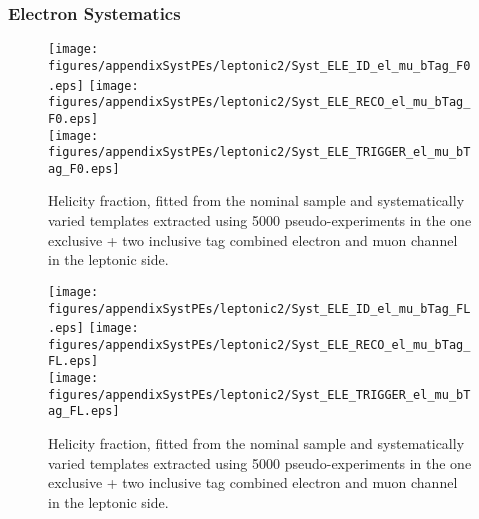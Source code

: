 \subsubsection{Electron Systematics}
\begin{figure}[!hb]
\begin{center}
        \texttt{[image: figures/appendixSystPEs/leptonic2/Syst\_ELE\_ID\_el\_mu\_bTag\_F0.eps]}
        \texttt{[image: figures/appendixSystPEs/leptonic2/Syst\_ELE\_RECO\_el\_mu\_bTag\_F0.eps]}\\
        \texttt{[image: figures/appendixSystPEs/leptonic2/Syst\_ELE\_TRIGGER\_el\_mu\_bTag\_F0.eps]}
\caption{Helicity fraction, \fo fitted from the nominal \ttbar sample and systematically varied templates extracted using 5000 pseudo-experiments in the one exclusive + two inclusive \bt tag combined electron and muon channel in the leptonic side. }
\label{fig:systematicVar_lep_f0_elmu2incl_ELE}
\end{center}
\end{figure}

\begin{figure}[!hb]
\begin{center}
        \texttt{[image: figures/appendixSystPEs/leptonic2/Syst\_ELE\_ID\_el\_mu\_bTag\_FL.eps]}
        \texttt{[image: figures/appendixSystPEs/leptonic2/Syst\_ELE\_RECO\_el\_mu\_bTag\_FL.eps]}\\
        \texttt{[image: figures/appendixSystPEs/leptonic2/Syst\_ELE\_TRIGGER\_el\_mu\_bTag\_FL.eps]}
\caption{Helicity fraction, \fl fitted from the nominal \ttbar sample and systematically varied templates extracted using 5000 pseudo-experiments in the one exclusive + two inclusive \bt tag combined electron and muon channel in the leptonic side. }
\label{fig:systematicVar_lep_FL_elmu2incl_ELE}
\end{center}
\end{figure}

